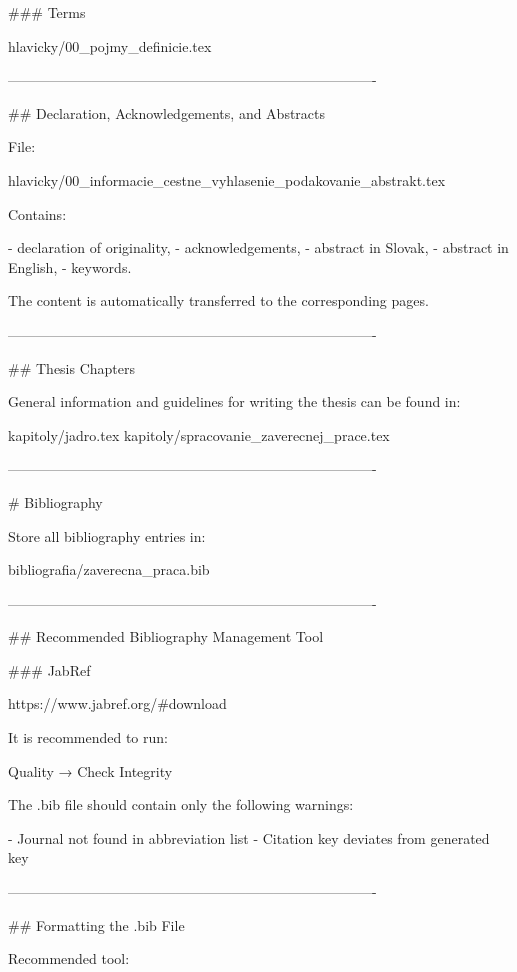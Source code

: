### Terms

hlavicky/00_pojmy_definicie.tex

-------------------------------------------------------------------------------

## Declaration, Acknowledgements, and Abstracts

File:

hlavicky/00_informacie_cestne_vyhlasenie_podakovanie_abstrakt.tex

Contains:

- declaration of originality,
- acknowledgements,
- abstract in Slovak,
- abstract in English,
- keywords.

The content is automatically transferred to the corresponding pages.

-------------------------------------------------------------------------------

## Thesis Chapters

General information and guidelines for writing the thesis can be found in:

kapitoly/jadro.tex  
kapitoly/spracovanie_zaverecnej_prace.tex

-------------------------------------------------------------------------------

# Bibliography

Store all bibliography entries in:

bibliografia/zaverecna_praca.bib

-------------------------------------------------------------------------------

## Recommended Bibliography Management Tool

### JabRef

https://www.jabref.org/#download

It is recommended to run:

Quality → Check Integrity

The .bib file should contain only the following warnings:

- Journal not found in abbreviation list
- Citation key deviates from generated key

-------------------------------------------------------------------------------

## Formatting the .bib File

Recommended tool:

